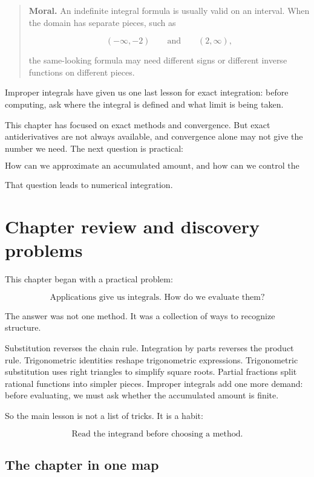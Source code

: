 \begin{quote}
\textbf{Moral.}
An indefinite integral formula is usually valid on an interval.  When the domain has
separate pieces, such as

\[
(-\infty,-2)
\qquad\text{and}\qquad
(2,\infty),
\]

the same-looking formula may need different signs or different inverse functions on
different pieces.
\end{quote}

Improper integrals have given us one last lesson for exact integration: before computing,
ask where the integral is defined and what limit is being taken.

This chapter has focused on exact methods and convergence.  But exact antiderivatives
are not always available, and convergence alone may not give the number we need.  The
next question is practical:

\[
\boxed{
\text{How can we approximate an accumulated amount, and how can we control the error?}
}
\]

That question leads to numerical integration.

\section{Chapter review and discovery problems}
\label{sec:chapter-11-review-discovery}

This chapter began with a practical problem:

\[
\text{Applications give us integrals.  How do we evaluate them?}
\]

The answer was not one method.  It was a collection of ways to recognize structure.

Substitution reverses the chain rule.  Integration by parts reverses the product rule.
Trigonometric identities reshape trigonometric expressions.  Trigonometric substitution
uses right triangles to simplify square roots.  Partial fractions split rational functions into
simpler pieces.  Improper integrals add one more demand: before evaluating, we must ask
whether the accumulated amount is finite.

So the main lesson is not a list of tricks.  It is a habit:

\[
\boxed{
\text{Read the integrand before choosing a method.}
}
\]

\subsection{The chapter in one map}
\label{subsec:chapter-11-one-map}

